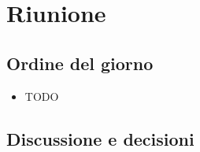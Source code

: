 \section{Riunione}
\subsection{Ordine del giorno}
\begin{itemize}
	\item TODO
\end{itemize}

\subsection{Discussione e decisioni}
